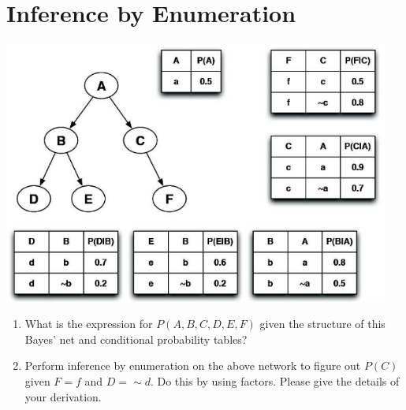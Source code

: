 \documentclass[12pt]{article}
\begin{document}
\clearpage

\section{Inference by Enumeration}

\begin{center}
\includegraphics[width=5in]{prob2.png}
\end{center}

\begin{enumerate}

\item What is the expression for $P(A,B,C,D,E,F)$ given the structure
  of this Bayes' net and conditional probability tables?

\item Perform inference by enumeration on the above network to figure
  out $P(C)$ given $F=f$ and $D= \sim d$.  Do this by using factors.
  Please give the details of your derivation.

\end{enumerate}
\end{document}
